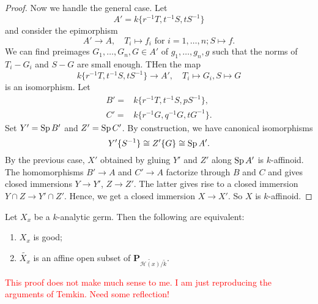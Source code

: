 \begin{proof}
    Now we handle the general case. Let
    \[
        A'=  k\{r^{-1}T,t^{-1}S,tS^{-1}\}
    \]
    and consider the epimorphism
    \[
        A'\rightarrow A,\quad T_i\mapsto f_i\text{ for }i=1,\ldots,n; S\mapsto f.  
    \]
    We can find preimages $G_1,\ldots,G_n,G\in A'$ of $g_1,\ldots,g_n,g$ such that the norms of $T_i-G_i$ and $S-G$ are small enough. THen the map
    \[
        k\{r^{-1}T,t^{-1}S,tS^{-1}\}\rightarrow A',\quad T_i\mapsto G_i,S\mapsto G
    \]
    is an isomorphism. Let
    \[
        \begin{aligned}
            B'= & k\{r^{-1}T,t^{-1}S,pS^{-1}\},\\
            C'= & k\{r^{-1}G,q^{-1}G,tG^{-1}\}.
        \end{aligned}  
    \]
    Set $Y'=\operatorname{Sp} B'$ and $Z'=\operatorname{Sp} C'$. By construction, we have canonical isomorphisms
    \[
        Y'\{S^{-1}\}\cong Z'\{G\}\cong \operatorname{Sp} A'.  
    \]
    By the previous case, $X'$ obtained by gluing $Y'$ and $Z'$ along $\operatorname{Sp} A'$ is $k$-affinoid. The homomorphisms $B'\rightarrow A$ and $C'\rightarrow A$ factorize through $B$ and $C$ and gives closed immersions $Y\rightarrow Y'$, $Z\rightarrow Z'$. The latter gives rise to a closed immersion $Y\cap Z\rightarrow Y'\cap Z'$. Hence, we get a closed immersion $X\rightarrow X'$. So $X$ is $k$-affinoid.
\end{proof}


\begin{thm}\label{thm-goodgermandreduction}
    Let $X_x$ be a $k$-analytic germ. Then the following are equivalent:
    \begin{enumerate}
        \item $X_x$ is good;
        \item $\widetilde{X_x}$ is an affine open subset of $\mathbf{P}_{\widetilde{\mathscr{H}(x)}/\tilde{k}}$.
    \end{enumerate}
\end{thm}

\textcolor{red}{This proof does not make much sense to me. I am just reproducing the arguments of Temkin. Need some reflection!}

